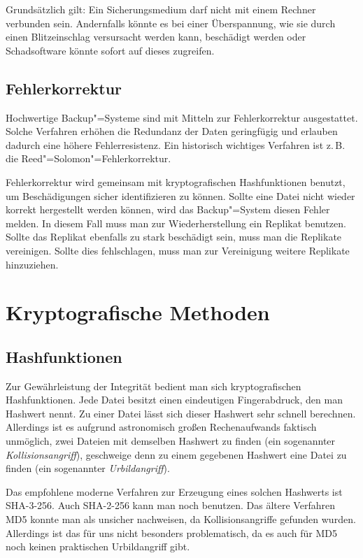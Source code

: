 \documentclass[a4paper,11pt,fleqn,twocolumn,twoside]{scrartcl}
\begin{document}
Grundsätzlich gilt: Ein Sicherungsmedium darf nicht mit einem Rechner
verbunden sein. Andernfalls könnte es bei einer Überspannung, wie sie
durch einen Blitzeinschlag versursacht werden kann, beschädigt werden
oder Schadsoftware könnte sofort auf dieses zugreifen.

\subsection{Fehlerkorrektur}

Hochwertige Backup"=Systeme sind mit Mitteln zur Fehlerkorrektur
ausgestattet. Solche Verfahren erhöhen die Redundanz der Daten
geringfügig und erlauben dadurch eine höhere Fehlerresistenz.
Ein historisch wichtiges Verfahren ist z.\,B.
die Reed"=Solomon"=Fehlerkorrektur.

Fehlerkorrektur wird gemeinsam mit kryptografischen Hashfunktionen
benutzt, um Beschädigungen sicher identifizieren zu können. Sollte
eine Datei nicht wieder korrekt hergestellt werden können, wird das
Backup"=System diesen Fehler melden. In diesem Fall muss man zur
Wiederherstellung ein Replikat benutzen. Sollte das Replikat
ebenfalls zu stark beschädigt sein, muss man die Replikate
vereinigen. Sollte dies fehlschlagen, muss man zur Vereinigung
weitere Replikate hinzuziehen.

\section{Kryptografische Methoden}

\subsection{Hashfunktionen}

Zur Gewährleistung der Integrität bedient man sich kryptografischen
Hashfunktionen. Jede Datei besitzt einen eindeutigen Fingerabdruck,
den man Hashwert nennt. Zu einer Datei lässt sich dieser Hashwert
sehr schnell berechnen. Allerdings ist es aufgrund astronomisch großen
Rechenaufwands faktisch unmöglich, zwei Dateien mit demselben Hashwert
zu finden (ein sogenannter \emph{Kollisionsangriff}), geschweige denn
zu einem gegebenen Hashwert eine Datei zu finden (ein sogenannter
\emph{Urbildangriff}).

Das empfohlene moderne Verfahren zur Erzeugung eines solchen
Hashwerts ist SHA-3-256. Auch SHA-2-256 kann man noch
benutzen. Das ältere Verfahren MD5 konnte man als unsicher
nachweisen, da Kollisionsangriffe gefunden wurden. Allerdings
ist das für uns nicht besonders problematisch, da es auch für MD5
noch keinen praktischen Urbildangriff gibt.
\end{document}
